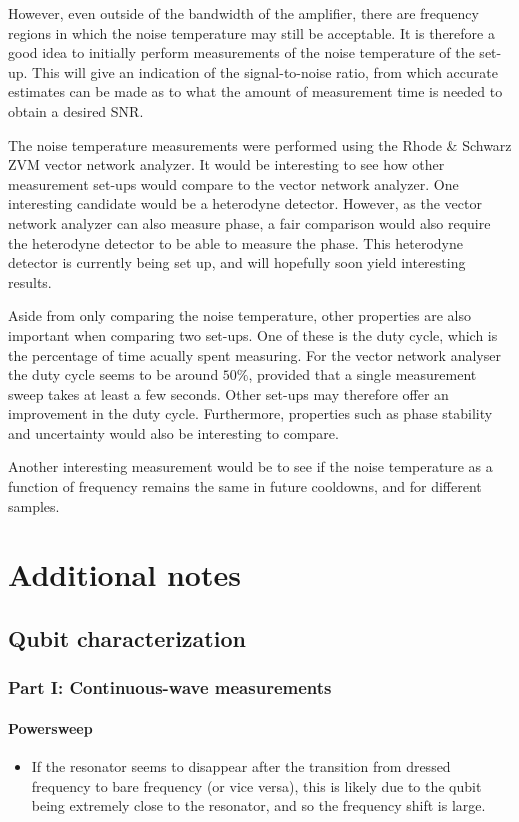However, even outside of the bandwidth of the amplifier, there are frequency regions in which the noise temperature may still be acceptable. It is therefore a good idea to initially perform measurements of the noise temperature of the set-up. This will give an indication of the signal-to-noise ratio, from which accurate estimates can be made as to what the amount of measurement time is needed to obtain a desired SNR.

The noise temperature measurements were performed using the Rhode \& Schwarz ZVM vector network analyzer. It would be interesting to see how other measurement set-ups would compare to the vector network analyzer. One interesting candidate would be a heterodyne detector. However, as the vector network analyzer can also measure phase, a fair comparison would also require the heterodyne detector to be able to measure the phase. This heterodyne detector is currently being set up, and will hopefully soon yield interesting results.

Aside from only comparing the noise temperature, other properties are also important when comparing two set-ups. One of these is the duty cycle, which is the percentage of time acually spent measuring. For the vector network analyser the duty cycle seems to be around $50\%$, provided that a single measurement sweep takes at least a few seconds. Other set-ups may therefore offer an improvement in the duty cycle. Furthermore, properties such as phase stability and uncertainty would also be interesting to compare.

Another interesting measurement would be to see if the noise temperature as a function of frequency remains the same in future cooldowns, and for different samples.





\chapter{Additional notes}
\section{Qubit characterization}
  \subsection{Part I: Continuous-wave measurements}
    \subsubsection{Powersweep}
      \begin{itemize}
        \item If the resonator seems to disappear after the transition from dressed frequency to bare frequency (or vice versa), this is likely due to the qubit being extremely close to the resonator, and so the frequency shift is large.
      \end{itemize}
